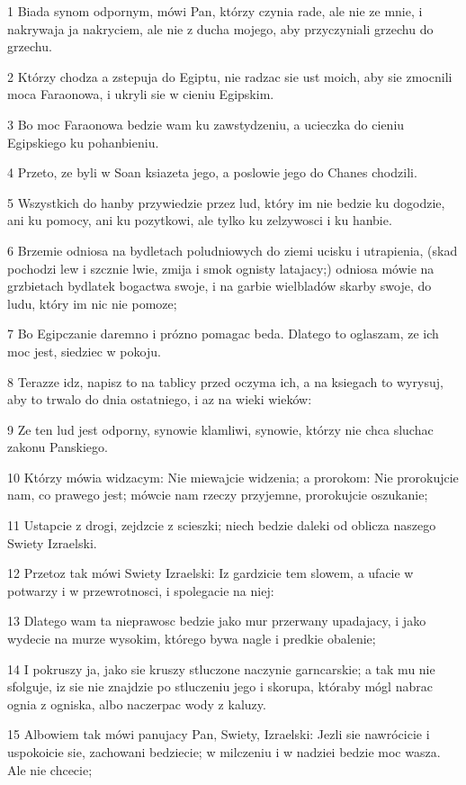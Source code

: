 \par 1 Biada synom odpornym, mówi Pan, którzy czynia rade, ale nie ze mnie, i nakrywaja ja nakryciem, ale nie z ducha mojego, aby przyczyniali grzechu do grzechu.
\par 2 Którzy chodza a zstepuja do Egiptu, nie radzac sie ust moich, aby sie zmocnili moca Faraonowa, i ukryli sie w cieniu Egipskim.
\par 3 Bo moc Faraonowa bedzie wam ku zawstydzeniu, a ucieczka do cieniu Egipskiego ku pohanbieniu.
\par 4 Przeto, ze byli w Soan ksiazeta jego, a poslowie jego do Chanes chodzili.
\par 5 Wszystkich do hanby przywiedzie przez lud, który im nie bedzie ku dogodzie, ani ku pomocy, ani ku pozytkowi, ale tylko ku zelzywosci i ku hanbie.
\par 6 Brzemie odniosa na bydletach poludniowych do ziemi ucisku i utrapienia, (skad pochodzi lew i szcznie lwie, zmija i smok ognisty latajacy;) odniosa mówie na grzbietach bydlatek bogactwa swoje, i na garbie wielbladów skarby swoje, do ludu, który im nic nie pomoze;
\par 7 Bo Egipczanie daremno i prózno pomagac beda. Dlatego to oglaszam, ze ich moc jest, siedziec w pokoju.
\par 8 Terazze idz, napisz to na tablicy przed oczyma ich, a na ksiegach to wyrysuj, aby to trwalo do dnia ostatniego, i az na wieki wieków:
\par 9 Ze ten lud jest odporny, synowie klamliwi, synowie, którzy nie chca sluchac zakonu Panskiego.
\par 10 Którzy mówia widzacym: Nie miewajcie widzenia; a prorokom: Nie prorokujcie nam, co prawego jest; mówcie nam rzeczy przyjemne, prorokujcie oszukanie;
\par 11 Ustapcie z drogi, zejdzcie z scieszki; niech bedzie daleki od oblicza naszego Swiety Izraelski.
\par 12 Przetoz tak mówi Swiety Izraelski: Iz gardzicie tem slowem, a ufacie w potwarzy i w przewrotnosci, i spolegacie na niej:
\par 13 Dlatego wam ta nieprawosc bedzie jako mur przerwany upadajacy, i jako wydecie na murze wysokim, którego bywa nagle i predkie obalenie;
\par 14 I pokruszy ja, jako sie kruszy stluczone naczynie garncarskie; a tak mu nie sfolguje, iz sie nie znajdzie po stluczeniu jego i skorupa, któraby mógl nabrac ognia z ogniska, albo naczerpac wody z kaluzy.
\par 15 Albowiem tak mówi panujacy Pan, Swiety, Izraelski: Jezli sie nawrócicie i uspokoicie sie, zachowani bedziecie; w milczeniu i w nadziei bedzie moc wasza. Ale nie chcecie;
